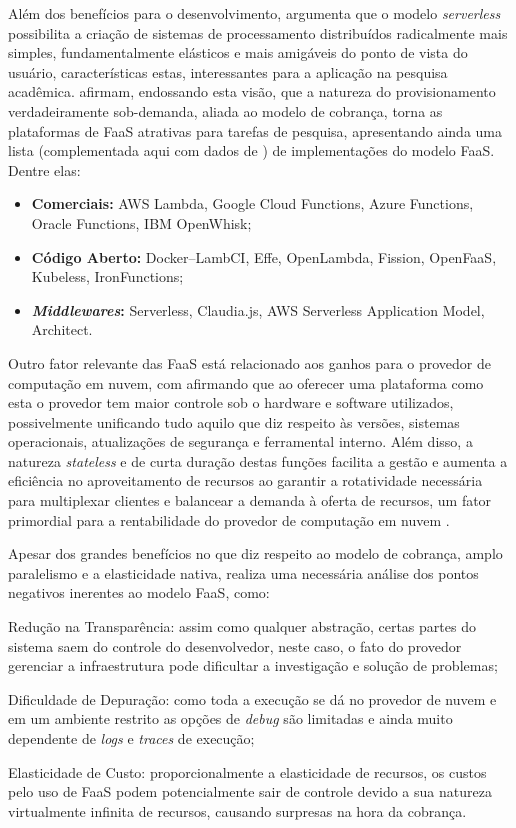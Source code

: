 \documentclass[english,brazilian]{UNISINOSmonografia} %
\begin{document}
Além dos benefícios para o desenvolvimento,  argumenta que o modelo \textit{serverless} possibilita a criação de sistemas de processamento distribuídos radicalmente mais simples, fundamentalmente elásticos e mais amigáveis do ponto de vista do usuário, características estas, interessantes para a aplicação na pesquisa acadêmica.
 afirmam, endossando esta visão, que a natureza do provisionamento verdadeiramente sob-demanda, aliada ao modelo de cobrança, torna as plataformas de FaaS atrativas para tarefas de pesquisa, apresentando ainda uma lista (complementada aqui com dados de ) de implementações do modelo FaaS. Dentre elas:
\begin{itemize}
	\item \textbf{Comerciais:} AWS Lambda, Google Cloud Functions, Azure Functions, Oracle Functions, IBM OpenWhisk;
	\item \textbf{Código Aberto:} Docker--LambCI, Effe, OpenLambda, Fission, OpenFaaS, Kubeless, IronFunctions;
	\item \textbf{\textit{Middlewares}:} Serverless, Claudia.js, AWS Serverless Application Model, Architect.
\end{itemize}


Outro fator relevante das FaaS está relacionado aos ganhos para o provedor de computação em nuvem, com  afirmando que ao oferecer uma plataforma como esta o provedor tem maior controle sob o hardware e software utilizados, possivelmente unificando tudo aquilo que diz respeito às versões, sistemas operacionais, atualizações de segurança e ferramental interno.
Além disso, a natureza \textit{stateless} e de curta duração destas funções facilita a gestão e aumenta a eficiência no aproveitamento de recursos ao garantir a rotatividade necessária para multiplexar clientes e balancear a demanda à oferta de recursos, um fator primordial para a rentabilidade do provedor de computação em nuvem \cite{Shankar2018}.


Apesar dos grandes benefícios no que diz respeito ao modelo de cobrança, amplo paralelismo e a elasticidade nativa,  realiza uma necessária análise dos pontos negativos inerentes ao modelo FaaS, como: 
\begin{inparaenum} 
	\item Redução na Transparência: assim como qualquer abstração, certas partes do sistema saem do controle do desenvolvedor, neste caso, o fato do provedor gerenciar a infraestrutura pode dificultar a investigação e solução de problemas;
	\item Dificuldade de Depuração: como toda a execução se dá no provedor de nuvem e em um ambiente restrito as opções de \textit{debug} são limitadas e ainda muito dependente de \textit{logs} e \textit{traces} de execução;
	\item Elasticidade de Custo: proporcionalmente a elasticidade de recursos, os custos pelo uso de FaaS podem potencialmente sair de controle devido a sua natureza virtualmente infinita de recursos, causando surpresas na hora da cobrança.
\end{inparaenum}
\end{document}
